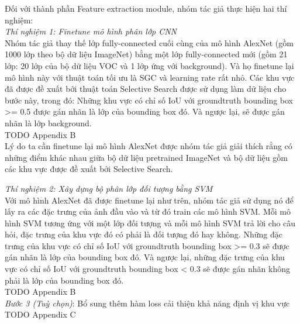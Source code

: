 {    \noindent
    Đối với thành phần Feature extraction module, nhóm tác giả thực hiện hai thí nghiệm: \\
    \textit{Thí nghiệm 1: Finetune mô hình phân lớp CNN} \\
    Nhóm tác giả thay thế lớp fully-connected cuối cùng của mô hình AlexNet (gồm 1000 lớp theo bộ dữ liệu ImageNet) bằng một lớp fully-connected mới (gồm 21 lớp: 20 lớp của bộ dữ liệu VOC và 1 lớp ứng với background).
    Và họ finetune lại mô hình này với thuật toán tối ưu là SGC và learning rate rất nhỏ.
    Các khu vực đã được đề xuất bởi thuật toán Selective Search được sử dụng làm dữ liệu cho bước này, trong đó:
    Những khu vực có chỉ số IoU với groundtruth bounding box >= 0.5 được gán nhãn là lớp của bounding box đó.
    Và ngược lại, sẽ được gán nhãn là lớp background. \\
    TODO Appendix B \\
    Lý do ta cần finetune lại mô hình AlexNet được nhóm tác giả giải thích rằng có những điểm khác nhau giữa bộ dữ liệu pretrained ImageNet và bộ dữ liệu gồm các khu vực được đề xuất bởi Selective Search.

    \noindent
    \textit{Thí nghiệm 2: Xây dựng bộ phân lớp đối tượng bằng SVM} \\
    Với mô hình AlexNet đã được finetune lại như trên, nhóm tác giả sử dụng nó để lấy ra các đặc trưng của ảnh đầu vào và từ đó train các mô hình SVM.
    Mỗi mô hình SVM tương ứng với một lớp đối tượng và mỗi mô hình SVM trả lời cho câu hỏi, đặc trưng của khu vực đó có phải là đối tượng đó hay không.
    Những đặc trưng của khu vực có chỉ số IoU với groundtruth bounding box >= 0.3 sẽ được gán nhãn là lớp của bounding box đó.
    Và ngược lại, những đặc trưng của khu vực có chỉ số IoU với groundtruth bounding box < 0.3 sẽ được gán nhãn không phải là lớp của bounding box đó. \\
    TODO Appendix B \\

    \textit{Bước 3 (Tuỳ chọn)}: Bổ sung thêm hàm loss cải thiện khả năng định vị khu vực \\
    TODO Appendix C \\

}
